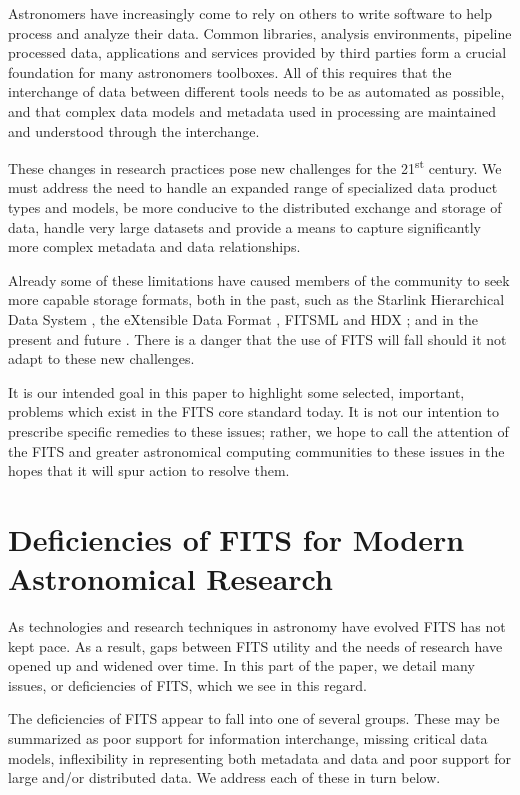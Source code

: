 \documentclass[final,authoryear,5p,times,twocolumn]{elsarticle}
\begin{document}
Astronomers have increasingly come to rely on others to write software
to help process and analyze their data. Common libraries, analysis
environments, pipeline processed data, applications and services
provided by third parties form a crucial foundation for many
astronomers toolboxes. All of this requires that the interchange of
data between different tools needs to be as automated as possible, and
that complex data models and metadata used in processing are
maintained and understood through the interchange.


These changes in research practices pose new challenges for the
21\textsuperscript{st} century. We must address the need to handle an
expanded range of specialized data product types and models, be more
conducive to the distributed exchange and storage of data, handle very
large datasets and provide a means to capture significantly more complex
metadata and data relationships.


Already some of these limitations have caused members of the community
to seek more capable storage formats, both in the past, such as the
Starlink Hierarchical Data System \citep[HDS;][]{1982QJRAS..23..485D},
the eXtensible Data Format \citep[XDF;][]{2001ASPC..238..217S}, FITSML
\citep{2001ASPC..238..487T} and HDX \citep{2003ASPC..295..221G}; and
in the present and future
\citep[e.g.][]{2011ASPC..442...53A,P91_adassxxiii}. There is a danger
that the use of FITS will fall should it not adapt to these new
challenges.


It is our intended goal in this paper to highlight some selected,
important, problems which exist in the FITS core standard today. It is
not our intention to prescribe specific remedies to these issues;
rather, we hope to call the attention of the FITS and greater
astronomical computing communities to these issues in the hopes that
it will spur action to resolve them.


\section{Deficiencies of FITS for Modern Astronomical Research}


As technologies and research techniques in astronomy have evolved FITS
has not kept pace. As a result, gaps between FITS utility and the
needs of research have opened up and widened over time. In this part
of the paper, we detail many issues, or deficiencies of FITS, which we
see in this regard.


The deficiencies of FITS appear to fall into one of several
groups. These may be summarized as poor support for information
interchange, missing critical data models, inflexibility in
representing both metadata and data and poor support for large and/or
distributed data. We address each of these in turn below.
\end{document}
